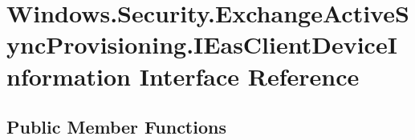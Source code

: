 \hypertarget{interface_windows_1_1_security_1_1_exchange_active_sync_provisioning_1_1_i_eas_client_device_information}{}\section{Windows.\+Security.\+Exchange\+Active\+Sync\+Provisioning.\+I\+Eas\+Client\+Device\+Information Interface Reference}
\label{interface_windows_1_1_security_1_1_exchange_active_sync_provisioning_1_1_i_eas_client_device_information}
\subsection*{Public Member Functions}

